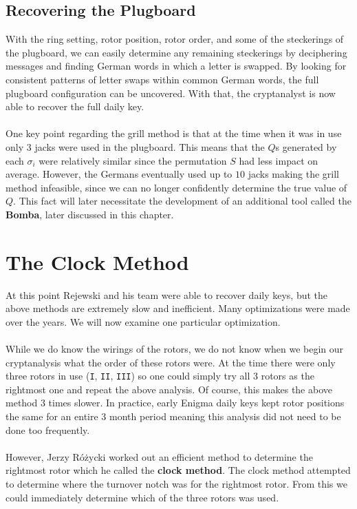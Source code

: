 \subsection{Recovering the Plugboard}
With the ring setting, rotor position, rotor order, and some of the
steckerings of the plugboard, we can easily determine any remaining
steckerings by deciphering messages and finding German words in which
a letter is swapped. By looking for consistent patterns of letter
swaps within common German words, the full plugboard configuration
can be uncovered. With that, the cryptanalyst is now able to recover
the full daily key.
\\\\One key point regarding the grill method is that at the time when
it was in use only $3$ jacks were used in the plugboard. This means
that the $Q$s generated by each $\sigma_i$ were relatively similar
since the permutation $S$ had less impact on average. However, the
Germans eventually used up to $10$ jacks making the grill method
infeasible, since we can no longer confidently determine the true
value of $Q$. This fact will later necessitate the development of an
additional tool called the {\bf{Bomba}}, later discussed in this chapter.
\section{The Clock Method}\label{clock_method}

At this point Rejewski and his team were able to recover daily keys,
but the above methods are extremely slow and inefficient. Many
optimizations were made over the years. We will now examine one
particular optimization.
\\\\While we do know the wirings of the rotors, we do not know when
we begin our cryptanalysis what the order of these rotors were. At
the time there were only three rotors in use (\texttt{I},
\texttt{II}, \texttt{III}) so one could simply try all 3 rotors as
the rightmost one and repeat the above analysis. Of course, this
makes the above method 3 times slower. In practice, early Enigma
daily keys kept rotor positions the same for an entire 3 month period
meaning this analysis did not need to be done too frequently.
\\\\However, Jerzy Różycki worked out an efficient method to
determine the rightmost rotor which he called the {\bf{clock
method}}. The clock method attempted to determine where the turnover
notch was for the rightmost rotor. From this we could immediately
determine which of the three rotors was used.

